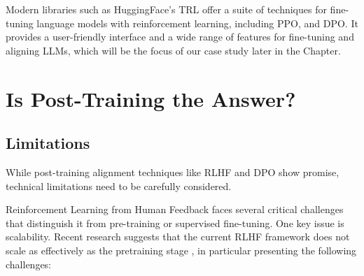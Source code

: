 Modern libraries such as HuggingFace's TRL  offer a suite of techniques for fine-tuning language models with reinforcement learning, including PPO, and DPO. It provides a user-friendly interface and a wide range of features for fine-tuning and aligning LLMs, which will be the focus of our case study later in the Chapter.

\section{Is Post-Training the Answer?}

\subsection{Limitations}

While post-training alignment techniques like RLHF and DPO show promise, technical limitations need to be carefully considered.

Reinforcement Learning from Human Feedback faces several critical challenges that distinguish it from pre-training or supervised fine-tuning. One key issue is scalability. Recent research suggests that the current RLHF framework does not scale as effectively as the pretraining stage , in particular presenting the following challenges:

